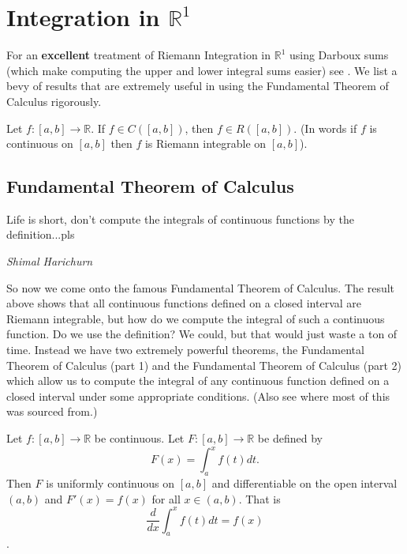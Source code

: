 
\chapter{Integration in $\mathbb{R}^1$}
	
	For an \textbf{excellent} treatment of Riemann Integration in $\mathbb{R}^1$ using Darboux sums (which make computing the upper and lower integral sums easier) see \cite{math310notes}. We list a bevy of results that are extremely useful in using the Fundamental Theorem of Calculus rigorously.
	
	
	
	\begin{theorem}
		Let $f : [a, b] \to \mathbb{R}$. If $f \in C\left( [a, b]\right)$, then $f \in R\left( [a, b]\right)$. (In words if $f$ is continuous on $[a, b]$ then $f$ is Riemann integrable on $[a, b]$).
	\end{theorem}
	
	
	
	\section{Fundamental Theorem of Calculus}
	
	\epigraph{Life is short, don't compute the integrals of continuous functions by the definition...pls}{\textit{Shimal Harichurn}} 
	
	So now we come onto the famous Fundamental Theorem of Calculus. The result above shows that all continuous functions defined on a closed interval are Riemann integrable, but how do we compute the integral of such a continuous function. Do we use the definition? We could, but that would just waste a ton of time. Instead we have two extremely powerful theorems, the Fundamental Theorem of Calculus (part 1) and the Fundamental Theorem of Calculus (part 2) which allow us to compute the integral of any continuous function defined on a closed interval under some appropriate conditions. (Also see \cite{wiki:xxx} where most of this was sourced from.)
	
	\begin{theorem}
		Let $f : [a, b] \to \mathbb{R}$ be continuous. Let $F : [a, b] \to \mathbb{R}$ be defined by $$F(x) = \int_{a}^x f(t) dt.$$ Then $F$ is uniformly continuous on $[a, b]$ and differentiable on the open interval $(a, b)$ and $F'(x) = f(x)$ for all $x \in (a, b)$. That is $$\frac{d}{dx} \int_{a}^x f(t) dt = f(x)$$.
	\end{theorem}
	
